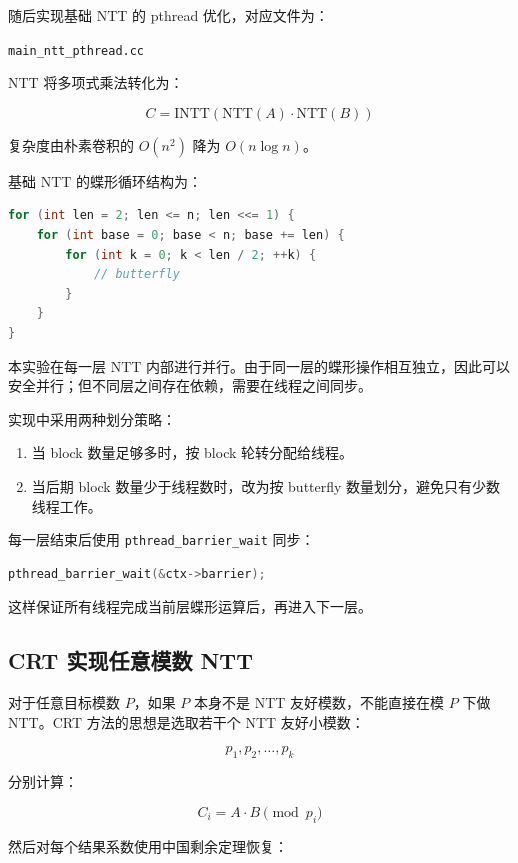 \documentclass[UTF8,a4paper,12pt]{ctexart}
\begin{document}
随后实现基础 NTT 的 pthread 优化，对应文件为：

\begin{center}
\texttt{main\_ntt\_pthread.cc}
\end{center}

NTT 将多项式乘法转化为：

\[
C = \mathrm{INTT}(\mathrm{NTT}(A) \cdot \mathrm{NTT}(B))
\]

复杂度由朴素卷积的 \(O(n^2)\) 降为 \(O(n\log n)\)。

基础 NTT 的蝶形循环结构为：

\begin{lstlisting}[language=C++]
for (int len = 2; len <= n; len <<= 1) {
    for (int base = 0; base < n; base += len) {
        for (int k = 0; k < len / 2; ++k) {
            // butterfly
        }
    }
}
\end{lstlisting}

本实验在每一层 NTT 内部进行并行。由于同一层的蝶形操作相互独立，因此可以安全并行；但不同层之间存在依赖，需要在线程之间同步。

实现中采用两种划分策略：

\begin{enumerate}
  \item 当 block 数量足够多时，按 block 轮转分配给线程。
  \item 当后期 block 数量少于线程数时，改为按 butterfly 数量划分，避免只有少数线程工作。
\end{enumerate}

每一层结束后使用 \texttt{pthread\_barrier\_wait} 同步：

\begin{lstlisting}[language=C++]
pthread_barrier_wait(&ctx->barrier);
\end{lstlisting}

这样保证所有线程完成当前层蝶形运算后，再进入下一层。

\subsection{CRT 实现任意模数 NTT}

对于任意目标模数 \(P\)，如果 \(P\) 本身不是 NTT 友好模数，不能直接在模 \(P\) 下做 NTT。CRT 方法的思想是选取若干个 NTT 友好小模数：

\[
p_1,p_2,\ldots,p_k
\]

分别计算：

\[
C_i = A \cdot B \pmod {p_i}
\]

然后对每个结果系数使用中国剩余定理恢复：
\end{document}
